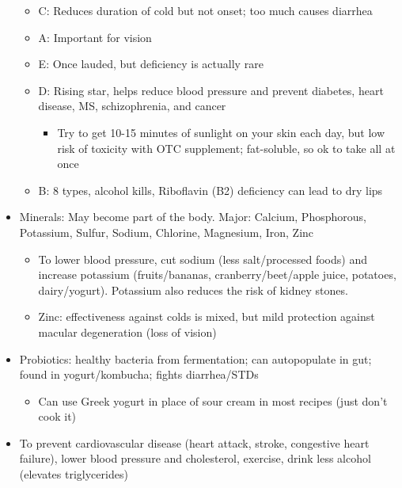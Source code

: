 \documentclass[
]{article}
\providecommand{\tightlist}{%
  \setlength{\itemsep}{0pt}\setlength{\parskip}{0pt}}
\begin{document}
\begin{itemize}
  \begin{itemize}
  \item
    C: Reduces duration of cold but not onset; too much causes diarrhea
  \item
    A: Important for vision
  \item
    E: Once lauded, but deficiency is actually rare
  \item
    D: Rising star, helps reduce blood pressure and prevent diabetes,
    heart disease, MS, schizophrenia, and cancer

    \begin{itemize}
    \tightlist
    \item
      Try to get 10-15 minutes of sunlight on your skin each day, but
      low risk of toxicity with OTC supplement; fat-soluble, so ok to
      take all at once
    \end{itemize}
  \item
    B: 8 types, alcohol kills, Riboflavin (B2) deficiency can lead to
    dry lips
  \end{itemize}
\item
  Minerals: May become part of the body. Major: Calcium, Phosphorous,
  Potassium, Sulfur, Sodium, Chlorine, Magnesium, Iron, Zinc

  \begin{itemize}
  \item
    To lower blood pressure, cut sodium (less salt/processed foods) and
    increase potassium (fruits/bananas, cranberry/beet/apple juice,
    potatoes, dairy/yogurt). Potassium also reduces the risk of kidney
    stones.
  \item
    Zinc: effectiveness against colds is mixed, but mild protection
    against macular degeneration (loss of vision)
  \end{itemize}
\item
  Probiotics: healthy bacteria from fermentation; can autopopulate in
  gut; found in yogurt/kombucha; fights diarrhea/STDs

  \begin{itemize}
  \tightlist
  \item
    Can use Greek yogurt in place of sour cream in most recipes (just
    don't cook it)
  \end{itemize}
\item
  To prevent cardiovascular disease (heart attack, stroke, congestive
  heart failure), lower blood pressure and cholesterol, exercise, drink
  less alcohol (elevates triglycerides)


\end{itemize}
\end{document}
